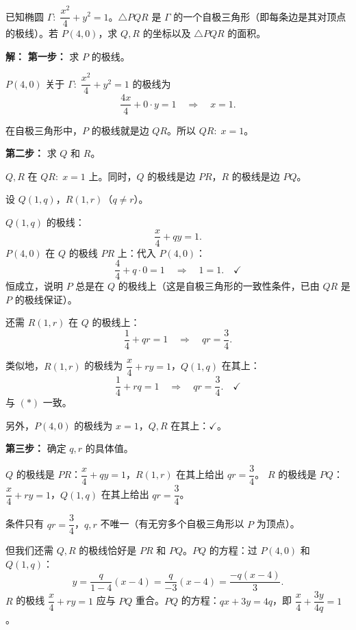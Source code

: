 \documentclass[12pt,a4paper]{ctexart}
\theoremstyle{definition}
\begin{document}
\vspace{6pt}

\begin{examplebox}
已知椭圆 $\Gamma:\;\dfrac{x^2}{4}+y^2=1$。$\triangle PQR$ 是 $\Gamma$ 的一个自极三角形（即每条边是其对顶点的极线）。若 $P(4,0)$，求 $Q,R$ 的坐标以及 $\triangle PQR$ 的面积。
\end{examplebox}

\begin{solutionbox}
\textbf{解：}
\textbf{第一步：} 求 $P$ 的极线。

$P(4,0)$ 关于 $\Gamma:\;\dfrac{x^2}{4}+y^2=1$ 的极线为
\[
  \frac{4x}{4}+0\cdot y=1 \quad\Longrightarrow\quad x=1.
\]

在自极三角形中，$P$ 的极线就是边 $QR$。所以 $QR:\;x=1$。

\textbf{第二步：} 求 $Q$ 和 $R$。

$Q,R$ 在 $QR:\;x=1$ 上。同时，$Q$ 的极线是边 $PR$，$R$ 的极线是边 $PQ$。

设 $Q(1,q)$，$R(1,r)$（$q\neq r$）。

$Q(1,q)$ 的极线：
\[
  \frac{x}{4}+qy=1.
\]
$P(4,0)$ 在 $Q$ 的极线 $PR$ 上：代入 $P(4,0)$：
\[
  \frac{4}{4}+q\cdot0=1 \quad\Longrightarrow\quad 1=1. \quad\checkmark
\]
恒成立，说明 $P$ 总是在 $Q$ 的极线上（这是自极三角形的一致性条件，已由 $QR$ 是 $P$ 的极线保证）。

还需 $R(1,r)$ 在 $Q$ 的极线上：
\[
  \frac{1}{4}+qr=1 \quad\Longrightarrow\quad qr=\frac{3}{4}. \tag{$*$}
\]

类似地，$R(1,r)$ 的极线为 $\dfrac{x}{4}+ry=1$，$Q(1,q)$ 在其上：
\[
  \frac{1}{4}+rq=1 \quad\Longrightarrow\quad qr=\frac{3}{4}. \quad\checkmark
\]
与 $(*)$ 一致。

另外，$P(4,0)$ 的极线为 $x=1$，$Q,R$ 在其上：$\checkmark$。

\textbf{第三步：} 确定 $q,r$ 的具体值。

$Q$ 的极线是 $PR$：$\dfrac{x}{4}+qy=1$，$R(1,r)$ 在其上给出 $qr=\dfrac{3}{4}$。
$R$ 的极线是 $PQ$：$\dfrac{x}{4}+ry=1$，$Q(1,q)$ 在其上给出 $qr=\dfrac{3}{4}$。

条件只有 $qr=\dfrac{3}{4}$，$q,r$ 不唯一（有无穷多个自极三角形以 $P$ 为顶点）。

但我们还需 $Q,R$ 的极线恰好是 $PR$ 和 $PQ$。$PQ$ 的方程：过 $P(4,0)$ 和 $Q(1,q)$：
\[
  y=\frac{q}{1-4}(x-4)=\frac{q}{-3}(x-4)=\frac{-q(x-4)}{3}.
\]
$R$ 的极线 $\dfrac{x}{4}+ry=1$ 应与 $PQ$ 重合。$PQ$ 的方程：$qx+3y=4q$，即 $\dfrac{x}{4}+\dfrac{3y}{4q}=1$。


\end{solutionbox}
\end{document}
